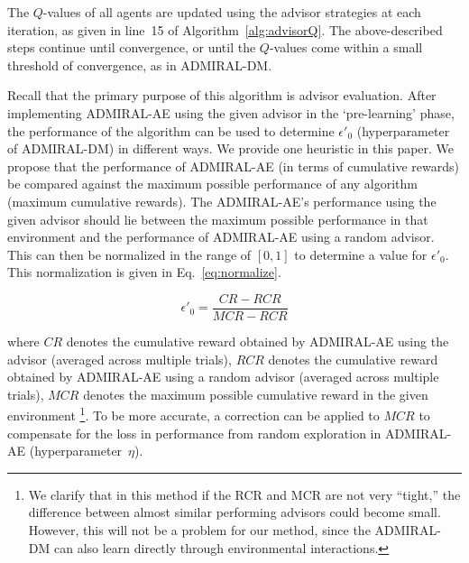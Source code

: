 \documentclass[jair, twoside,11pt,theapa]{article}
\begin{document}
The $Q$-values of all agents are updated using the advisor strategies at each iteration, as given in line~15 of Algorithm~\ref{alg:advisorQ}. The above-described steps continue until convergence, or until the $Q$-values come within a small threshold of convergence, as in ADMIRAL-DM.
 


Recall that the primary purpose of this algorithm is advisor evaluation. After implementing ADMIRAL-AE using the given advisor in the `pre-learning' phase, the performance of the algorithm can be used to determine $\epsilon'_0$ (hyperparameter of ADMIRAL-DM) in different ways. We provide one heuristic in this paper. We propose that the performance of ADMIRAL-AE (in terms of cumulative rewards) be compared against the maximum possible performance of any algorithm (maximum cumulative rewards). The ADMIRAL-AE's performance using the given advisor should lie between the maximum possible performance in that environment and the performance of ADMIRAL-AE using a random advisor. This can then be normalized in the range of $[0,1]$ to determine a value for $\epsilon'_0$. This normalization is given in Eq.~\ref{eq:normalize}. 

\begin{equation}\label{eq:normalize}
    \epsilon'_0 = \frac{CR - RCR}{MCR - RCR}
\end{equation}

\noindent where $CR$ denotes the cumulative reward obtained by ADMIRAL-AE using the advisor (averaged across multiple trials), $RCR$ denotes the cumulative reward obtained by ADMIRAL-AE using a random advisor (averaged across multiple trials), $MCR$ denotes the maximum possible cumulative reward in the given environment \footnote{We clarify that in this method if the RCR and MCR are not very “tight,” the difference between almost similar performing advisors could become small. However, this will not be a problem for our method, since the ADMIRAL-DM can also learn directly through environmental interactions.}. To be more accurate, a correction can be applied to $MCR$ to compensate for the loss in performance from random exploration in ADMIRAL-AE (hyperparameter~$\eta$). 
\end{document}
